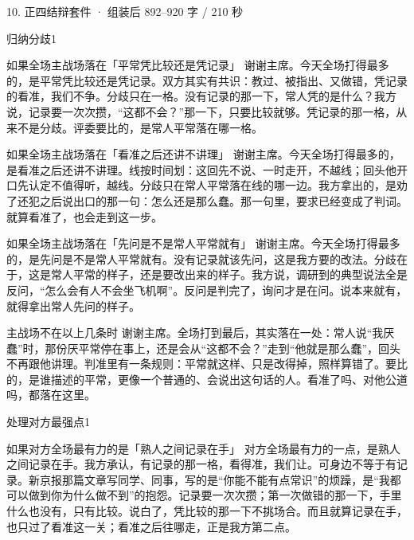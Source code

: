 \documentclass[script,pro]{debate}
\begin{document}
\begin{kit}{10. 正四结辩}{套件 · 组装后 892–920 字 / 210 秒}
\begin{pick}{归纳分歧}{1}
\begin{module}{如果全场主战场落在「平常凭比较还是凭记录」}
谢谢主席。今天全场打得最多的，是平常凭比较还是凭记录。双方其实有共识：教过、被指出、又做错，凭记录的看准，我们不争。分歧只在一格。没有记录的那一下，常人凭的是什么？我方说，记录要一次次攒，“这都不会？”那一下，只要比较就够。凭记录的那一格，从来不是分歧。评委要比的，是常人平常落在哪一格。
\end{module}
\begin{module}{如果全场主战场落在「看准之后还讲不讲理」}
谢谢主席。今天全场打得最多的，是看准之后还讲不讲理。线按时间划：这回先不说、一时走开，不越线；回头他开口先认定不值得听，越线。分歧只在常人平常落在线的哪一边。我方拿出的，是劝了还犯之后说出口的那一句：怎么还是那么蠢。那一句里，要求已经变成了判词。就算看准了，也会走到这一步。
\end{module}
\begin{module}{如果全场主战场落在「先问是不是常人平常就有」}
谢谢主席。今天全场打得最多的，是先问是不是常人平常就有。没有记录就该先问，这是我方要的改法。分歧在于，这是常人平常的样子，还是要改出来的样子。我方说，调研到的典型说法全是反问，“怎么会有人不会坐飞机啊”。反问是判完了，询问才是在问。说本来就有，就得拿出常人先问的样子。
\end{module}
\begin{fallback}{主战场不在以上几条时}
谢谢主席。全场打到最后，其实落在一处：常人说“我厌蠢”时，那份厌平常停在事上，还是会从“这都不会？”走到“他就是那么蠢”，回头不再跟他讲理。判准里有一条规则：平常就这样、只是改得掉，照样算错了。要比的，是谁描述的平常，更像一个普通的、会说出这句话的人。看准了吗、对他公道吗，都落在这里。
\end{fallback}
\end{pick}
\begin{pick}{处理对方最强点}{1}
\begin{module}{如果对方全场最有力的是「熟人之间记录在手」}
对方全场最有力的一点，是熟人之间记录在手。我方承认，有记录的那一格，看得准，我们让。可身边不等于有记录。新京报那篇文章写同学、同事，写的是“你能不能有点常识”的烦躁，是“我都可以做到你为什么做不到”的抱怨。记录要一次次攒；第一次做错的那一下，手里什么也没有，只有比较。说白了，凭比较的那一下不挑场合。而且就算记录在手，也只过了看准这一关；看准之后往哪走，正是我方第二点。
\end{module}

\end{pick}
\end{kit}
\end{document}
